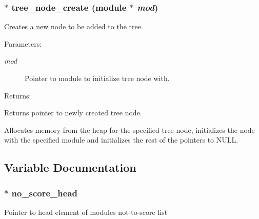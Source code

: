 \subsubsection{$\ast$ tree\_\-node\_\-create ({\bf module} $\ast$ {\em mod})}\label{tree_8c_a1}


Creates a new node to be added to the tree.

\begin{Desc}
\item[Parameters: ]\par
\begin{description}
\item[{\em 
mod}]Pointer to module to initialize tree node with. \end{description}
\end{Desc}
\begin{Desc}
\item[Returns: ]\par
Returns pointer to newly created tree node.\end{Desc}
Allocates memory from the heap for the specified tree node, initializes the node with the specified module and initializes the rest of the pointers to NULL. 

\subsection{Variable Documentation}
\subsubsection{$\ast$ no\_\-score\_\-head}\label{tree_8c_a0}


Pointer to head element of modules not-to-score list 